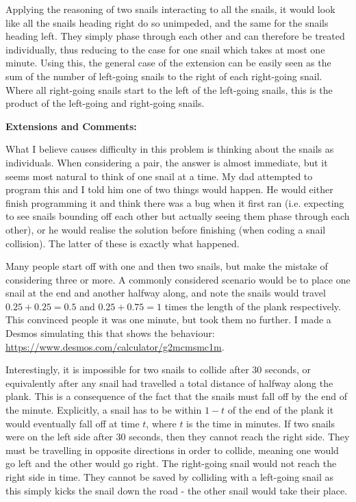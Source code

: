 Applying the reasoning of two snails interacting to all the snails, it would look like all the snails heading right do so unimpeded, and the same for the snails heading left. They simply phase through each other and can therefore be treated individually, thus reducing to the case for one snail which takes at most one minute. Using this, the general case of the extension can be easily seen as the sum of the number of left-going snails to the right of each right-going snail. Where all right-going snails start to the left of the left-going snails, this is the product of the left-going and right-going snails.

\textbf{Extensions and Comments:}

What I believe causes difficulty in this problem is thinking about the snails as individuals. When considering a pair, the answer is almost immediate, but it seems most natural to think of one snail at a time. My dad attempted to program this and I told him one of two things would happen. He would either finish programming it and think there was a bug when it first ran (i.e. expecting to see snails bounding off each other but actually seeing them phase through each other), or he would realise the solution before finishing (when coding a snail collision). The latter of these is exactly what happened.

Many people start off with one and then two snails, but make the mistake of considering three or more. A commonly considered scenario would be to place one snail at the end and another halfway along, and note the snails would travel $0.25 + 0.25 = 0.5$ and $0.25 + 0.75 = 1$ times the length of the plank respectively. This convinced people it was one minute, but took them no further. I made a Desmos simulating this that shows the behaviour: \url{https://www.desmos.com/calculator/g2mcmsmc1m}.

Interestingly, it is impossible for two snails to collide after 30 seconds, or equivalently after any snail had travelled a total distance of halfway along the plank. This is a consequence of the fact that the snails must fall off by the end of the minute. Explicitly, a snail has to be within $1 - t$ of the end of the plank it would eventually fall off at time $t$, where $t$ is the time in minutes. If two snails were on the left side after 30 seconds, then they cannot reach the right side. They must be travelling in opposite directions in order to collide, meaning one would go left and the other would go right. The right-going snail would not reach the right side in time. They cannot be saved by colliding with a left-going snail as this simply kicks the snail down the road - the other snail would take their place.

